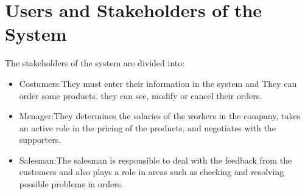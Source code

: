 \section{Users and Stakeholders of the System}
The stakeholders of the system are divided into:
\begin{itemize}
	\item Costumers:They must enter their information in the system and They can order some products. they can see, modify or cancel their orders.
	\item Menager:They determines the salaries of the workers in the company, takes an active role in the pricing of the products, and negotiates with the supporters.
	\item Salesman:The salesman is responsible to deal with the feedback from the customers and also plays a role in areas such as checking and resolving possible problems in orders.
\end{itemize}